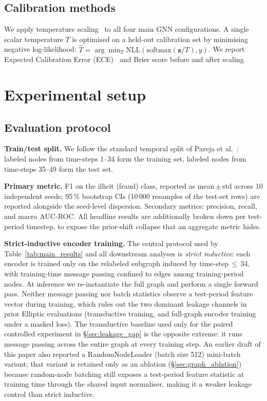 \subsection{Calibration methods}
\label{sec:calibration_methods}

We apply temperature scaling~\citep{guo2017calibration} to all four
main GNN configurations.  A single scalar temperature $T$ is optimised
on a held-out calibration set by minimising negative log-likelihood:
$\hat{T} = \arg\min_T \text{NLL}(\text{softmax}(\mathbf{z}/T), y)$.
We report Expected Calibration Error
(ECE)~\citep{naeini2015calibration} and Brier score before and after
scaling.


\section{Experimental setup}
\label{sec:setup}

\subsection{Evaluation protocol}

\textbf{Train/test split.}  We follow the standard temporal split
of Pareja et al.~\citep{pareja2020evolvegcn}: labeled nodes from
time-steps 1--34 form the training set, labeled nodes from time-steps
35--49 form the test set.

\textbf{Primary metric.}  F1 on the illicit (fraud) class, reported as
mean\,$\pm$\,std across 10 independent seeds; 95\,\% bootstrap CIs
(10\,000 resamples of the test-set rows) are reported alongside the
seed-level dispersion.  Secondary metrics: precision, recall, and
macro AUC-ROC.  All headline results are additionally broken down per
test-period timestep, to expose the prior-shift collapse that an
aggregate metric hides.

\textbf{Strict-inductive encoder training.}  The central protocol
used by Table~\ref{tab:main_results} and all downstream analyses is
\emph{strict inductive}: each encoder is trained only on the relabeled
subgraph induced by time-step\,$\le$\,34, with training-time message
passing confined to edges among training-period nodes.  At inference
we re-instantiate the full graph and perform a single forward pass.
Neither message passing nor batch statistics observe a test-period
feature vector during training, which rules out the two dominant
leakage channels in prior Elliptic evaluations (transductive training,
and full-graph encoder training under a masked loss).  The
transductive baseline used only for the paired controlled experiment
in \S\ref{sec:leakage_gap} is the opposite extreme: it runs message
passing across the entire graph at every training step.  An earlier
draft of this paper also reported a RandomNodeLoader (batch size 512)
mini-batch variant; that variant is retained only as an ablation
(\S\ref{sec:graph_ablation}) because random-node batching still
exposes a test-period feature statistic at training time through the
shared input normaliser, making it a weaker leakage control than
strict inductive.

